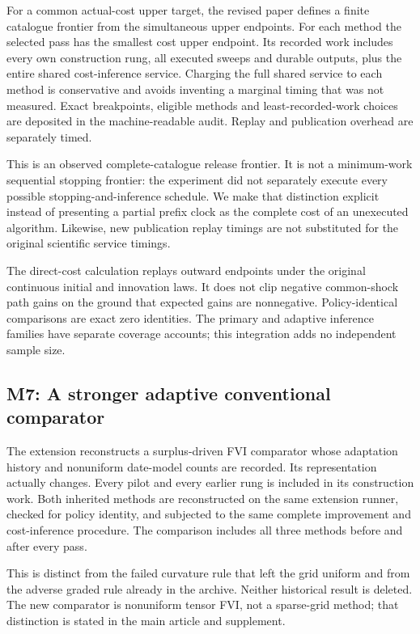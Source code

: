 For a common actual-cost upper target, the revised paper defines a
finite catalogue frontier from the simultaneous upper endpoints. For
each method the selected pass has the smallest cost upper endpoint. Its
recorded work includes every own construction rung, all executed sweeps
and durable outputs, plus the entire shared cost-inference service.
Charging the full shared service to each method is conservative and
avoids inventing a marginal timing that was not measured. Exact
breakpoints, eligible methods and least-recorded-work choices are
deposited in the machine-readable audit. Replay and publication overhead
are separately timed.

This is an observed complete-catalogue release frontier. It is not a
minimum-work sequential stopping frontier: the experiment did not
separately execute every possible stopping-and-inference schedule. We
make that distinction explicit instead of presenting a partial prefix
clock as the complete cost of an unexecuted algorithm. Likewise, new
publication replay timings are not substituted for the original
scientific service timings.

The direct-cost calculation replays outward endpoints under the original
continuous initial and innovation laws. It does not clip negative
common-shock path gains on the ground that expected gains are
nonnegative. Policy-identical comparisons are exact zero identities. The
primary and adaptive inference families have separate coverage accounts;
this integration adds no independent sample size.

\hypertarget{m7-a-stronger-adaptive-conventional-comparator}{%
\subsection{M7: A stronger adaptive conventional
comparator}\label{m7-a-stronger-adaptive-conventional-comparator}}

The extension reconstructs a surplus-driven FVI comparator whose
adaptation history and nonuniform date-model counts are recorded. Its
representation actually changes. Every pilot and every earlier rung is
included in its construction work. Both inherited methods are
reconstructed on the same extension runner, checked for policy identity,
and subjected to the same complete improvement and cost-inference
procedure. The comparison includes all three methods before and after
every pass.

This is distinct from the failed curvature rule that left the grid
uniform and from the adverse graded rule already in the archive. Neither
historical result is deleted. The new comparator is nonuniform tensor
FVI, not a sparse-grid method; that distinction is stated in the main
article and supplement.


